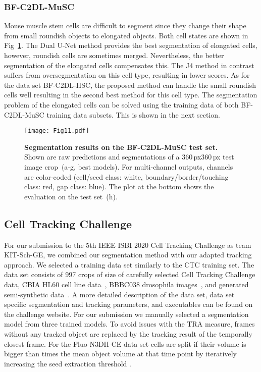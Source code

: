 \documentclass[10pt,letterpaper]{article}
\begin{document}
\subsubsection*{BF-C2DL-MuSC}
Mouse muscle stem cells are difficult to segment since they change their shape from small roundish objects to elongated objects. Both cell states are shown in Fig~\ref{fig:bf-c2dl-musc-results}. The Dual U-Net method provides the best segmentation of elongated cells, however, roundish cells are sometimes merged. Nevertheless, the better segmentation of the elongated cells compensates this. The J4 method in contrast suffers from oversegmentation on this cell type, resulting in lower scores. As for the data set BF-C2DL-HSC, the proposed method can handle the small roundish cells well resulting in the second best method for this cell type. The segmentation problem of the elongated cells can be solved using the training data of both BF-C2DL-MuSC training data subsets. This is shown in the next section.
\begin{figure}
\begin{adjustwidth}{-2.25in}{0in}
\centering
\texttt{[image: Fig11.pdf]}
\caption{\textbf{Segmentation results on the BF-C2DL-MuSC test set.} Shown are raw predictions and segmentations of a 360\,px360\,px test image crop~(a-g, best  models). For multi-channel outputs, channels are color-coded (cell/seed class: white, boundary/border/touching class: red, gap class: blue). The plot at the bottom shows the evaluation on the test set~(h).}
\label{fig:bf-c2dl-musc-results}
\end{adjustwidth}
\end{figure}

\subsection*{Cell Tracking Challenge}
For our submission to the 5th IEEE ISBI 2020 Cell Tracking Challenge as team KIT-Sch-GE, we combined our segmentation method with our adapted tracking approach. We selected a training data set similarly to the CTC training set. The data set consists of 997 crops of size  of carefully selected Cell Tracking Challenge data, CBIA HL60 cell line data~\cite{Svoboda2009}, BBBC038 drosophila images~\cite{Caicedo2019}, and generated semi-synthetic data~\cite{Stegmaier2017, Stegmaier2016}. A more detailed description of the data set, data set specific segmentation and tracking parameters, and executables can be found on the challenge website. For our submission we manually selected a segmentation model from three trained models. To avoid issues with the TRA measure, frames without any tracked object are replaced by the tracking result of the temporally closest frame. For the Fluo-N3DH-CE data set cells are split if their volume is bigger than  times the mean object volume at that time point by iteratively increasing the seed extraction threshold .
\end{document}
